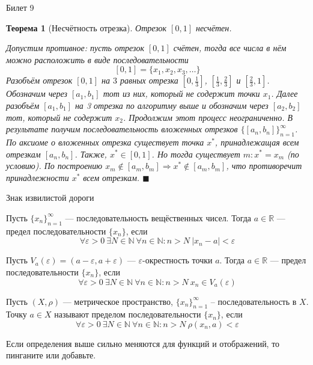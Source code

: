 \documentclass[12pt,a4paper]{article}
\newtheorem*{theorem*}{Теорема}
\begin{document}
\begin{center}
Билет 9
\end{center}

\begin{theorem*}[Несчётность отрезка]
\label{9.1}
Отрезок $[0, 1]$ несчётен.

Допустим противное: пусть отрезок $[0, 1]$ счётен, тогда все числа в нём можно расположить в виде последовательности
$$
[0, 1] = \{ x_1, x_2, x_3, \ldots \}
$$
Разобъём отрезок $[0, 1]$ на $3$ равных отрезка $[0, \frac{1}{3}]$, $[\frac{1}{3}, \frac{2}{3}]$ и $[\frac{2}{3}, 1]$. Обозначим через $[a_1, b_1]$ тот из них, который не содержит точки $x_1$. Далее разобъём $[a_1, b_1]$ на 3 отрезка по алгоритму выше и обозначим через $[a_2, b_2]$ тот, который не содержит $x_2$. Продолжим этот процесс неограниченно. В результате получим последовательность вложенных отрезков $\{ [a_n, b_n] \}_{n=1}^{\infty}$. По аксиоме о вложенных отрезка существует точка $x^{*}$, принадлежащая всем отрезкам $[a_n, b_n]$. Также, $x^{*} \in [0, 1]$. Но тогда существует $m: x^{*}=x_m$ (по условию). По построению $x_m \not\in [a_m, b_m] \Rightarrow x^{*} \not\in [a_m, b_m]$, что противоречит принадлежности $x^{*}$ всем отрезкам. $\blacksquare$
\end{theorem*}

\begin{center}
Знак извилистой дороги
\end{center}

Пусть $\{ x_n \}_{n=1}^{\infty}$ --- последовательность вещёственных чисел. Тогда $a \in \mathbb{R}$ --- предел последовательности $\{ x_n \}$, если
$$
\forall \varepsilon>0 \ \exists N \in \mathbb{N} \ \forall n \in \mathbb{N}: n > N \  |x_n - a| < \varepsilon
$$

Пусть $V_{a}(\varepsilon) = (a-\varepsilon, a+\varepsilon)$ --- $\varepsilon$-окрестность точки $a$. Тогда $a \in \mathbb{R}$ --- предел последовательности $\{ x_n \}$, если
$$
\forall \varepsilon>0 \ \exists N \in \mathbb{N} \ \forall n \in \mathbb{N}: n > N \ x_n \in V_a(\varepsilon)
$$

Пусть $(X, \rho)$ --- метрическое пространство, $\{ x_n \}_{n=1}^{\infty}$ -- последовательность в $X$. Точку $a \in X$ называют пределом последовательности $\{ x_n \}$, если
$$
\forall \varepsilon > 0 \ \exists N \in \mathbb{N} \ \forall n \in \mathbb{N}: n > N \ \rho(x_n, a) < \varepsilon
$$

Если определения выше сильно меняются для функций и отображений, то пинганите или добавьте.
\end{document}
